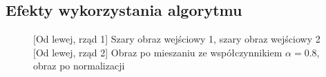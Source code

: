 \documentclass[a4paper,12pt, titlepage]{report}
\begin{document}
\subsection*{Efekty wykorzystania algorytmu}
\begin{figure}[h]
    \centering
    \qquad
    \caption{[Od lewej, rząd 1] Szary obraz wejściowy 1, szary obraz wejściowy 2 [Od lewej, rząd 2] Obraz po mieszaniu ze współczynnikiem \(\alpha=0.8\), obraz po normalizacji}%
    \label{fig:geo_after_grey1}%
\end{figure}
\end{document}
